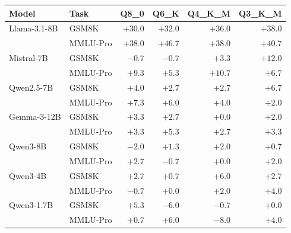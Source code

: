 \begin{tabular}{llrrrr}
\toprule
Model & Task & Q8\_0 & Q6\_K & Q4\_K\_M & Q3\_K\_M \\
\midrule
Llama-3.1-8B & GSM8K & $+30.0$ & $+32.0$ & $+36.0$ & $+38.0$ \\
 & MMLU-Pro & $+38.0$ & $+46.7$ & $+38.0$ & $+40.7$ \\
Mistral-7B & GSM8K & $-0.7$ & $-0.7$ & $+3.3$ & $+12.0$ \\
 & MMLU-Pro & $+9.3$ & $+5.3$ & $+10.7$ & $+6.7$ \\
Qwen2.5-7B & GSM8K & $+4.0$ & $+2.7$ & $+2.7$ & $+6.7$ \\
 & MMLU-Pro & $+7.3$ & $+6.0$ & $+4.0$ & $+2.0$ \\
Gemma-3-12B & GSM8K & $+3.3$ & $+2.7$ & $+0.0$ & $+2.0$ \\
 & MMLU-Pro & $+3.3$ & $+5.3$ & $+2.7$ & $+3.3$ \\
Qwen3-8B & GSM8K & $-2.0$ & $+1.3$ & $+2.0$ & $+0.7$ \\
 & MMLU-Pro & $+2.7$ & $-0.7$ & $+0.0$ & $+2.0$ \\
Qwen3-4B & GSM8K & $+2.7$ & $+0.7$ & $+6.0$ & $+2.7$ \\
 & MMLU-Pro & $-0.7$ & $+0.0$ & $+2.0$ & $+4.0$ \\
Qwen3-1.7B & GSM8K & $+5.3$ & $-6.0$ & $-0.7$ & $+0.0$ \\
 & MMLU-Pro & $+0.7$ & $+6.0$ & $-8.0$ & $+4.0$ \\
\bottomrule
\end{tabular}
